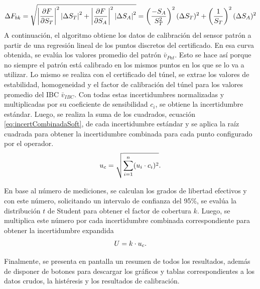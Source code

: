 \begin{equation}
    \centering
    \Delta F_{bk} =  \sqrt{\left\lvert \frac{\partial F}{\partial S_T} \right\rvert^2 \left\lvert\Delta S_T\right\rvert^2 + \left\lvert \frac{\partial F}{\partial S_A} \right\rvert^2 \left\lvert\Delta S_A\right\rvert^2} = \left( \frac{-S_{A}}{S_{T}^{2}} \right)^2 (\Delta S_T)^2 + \left( \frac{1}{S_{T}} \right)^2 (\Delta S_A)^2
    \label{eq:incertiFactorBloqueo}
\end{equation}
A continuación, el algoritmo obtiene los datos de calibración del sensor patrón a partir de una regresión lineal de los puntos discretos del certificado. En esa curva obtenida, se evalúa los valores promedio del patrón $\bar{v}_{Pat}$. Esto se hace así porque no siempre el patrón está calibrado en los mismos puntos en los que se lo va a utilizar. Lo mismo se realiza con el certificado del túnel, se extrae los valores de estabilidad, homogeneidad y el factor de calibración del túnel para los valores promedio del IBC $\bar{v}_{IBC}$. Con todas estas incertidumbres normalizadas y multiplicadas por su coeficiente de sensibilidad $c_{i}$, se obtiene la incertidumbre estándar. Luego, se realiza la suma de los cuadrados, ecuación \ref{eq:incertCombinadaSoft}, de cada incertidumbre estándar y se aplica la raíz cuadrada para obtener la incertidumbre combinada para cada punto configurado por el operador.
\begin{equation}
    \centering
    u_c = \sqrt{\sum_{i=1}^{n} (u_{i} \cdot c_{i})^2}.
\label{eq:incertCombinadaSoft}
\end{equation}

En base al número de mediciones, se calculan los grados de libertad efectivos y con este número, solicitando un intervalo de confianza del 95\%, se evalúa la distribución $t$ de Student para obtener el factor de cobertura $k$. Luego, se multiplica este número por cada incertidumbre combinada correspondiente para obtener la incertidumbre expandida 
\begin{equation}
    \centering
    U = k \cdot u_c.
\label{eq:incertExpandidaSoft}
\end{equation}

Finalmente, se presenta en pantalla un resumen de todos los resultados, además de disponer de botones para descargar los gráficos y tablas correspondientes a los datos crudos, la histéresis y los resultados de calibración.


